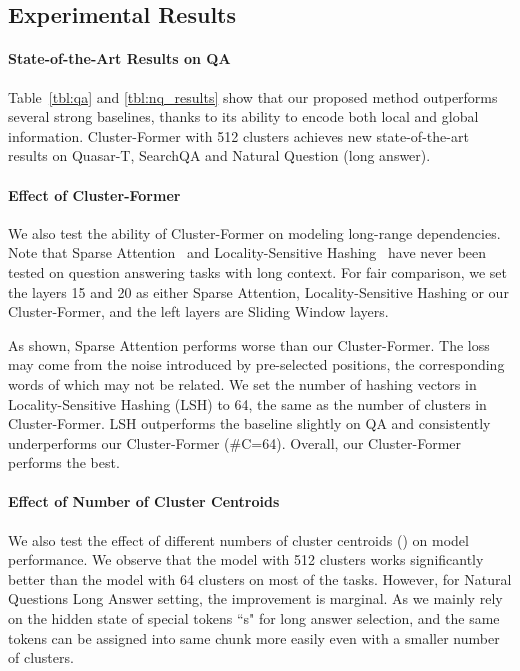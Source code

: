 \subsection{Experimental Results}

\paragraph{State-of-the-Art Results on QA} 
Table~\ref{tbl:qa} and \ref{tbl:nq_results} show that our proposed method outperforms several strong baselines, thanks to its ability to encode both local and global information.
Cluster-Former with 512 clusters achieves new state-of-the-art results on Quasar-T, SearchQA and Natural Question (long answer).

\paragraph{Effect of Cluster-Former}
We also test the ability of Cluster-Former on modeling long-range dependencies.
Note that Sparse Attention~\citep{sparsetransf} and Locality-Sensitive Hashing~\citep{reformer} have never been tested on question answering tasks with long context.
For fair comparison, we set the layers 15 and 20 as either Sparse Attention, Locality-Sensitive Hashing or our Cluster-Former, and the left layers are Sliding Window layers. 


As shown, Sparse Attention performs worse than our Cluster-Former.
The loss may come from the noise introduced by pre-selected positions, the corresponding words of which may not be related.
We set the number of hashing vectors in Locality-Sensitive Hashing (LSH) to 64, the same as the number of clusters in Cluster-Former.
LSH outperforms the baseline slightly on QA and consistently underperforms our Cluster-Former (\#C=64).
Overall, our Cluster-Former performs the best.

\paragraph{Effect of Number of Cluster Centroids} 
We also test the effect of different numbers of cluster centroids () on model performance. 
We observe that the model with 512 clusters works significantly better than the model with 64 clusters on most of the tasks.
However, for Natural Questions Long Answer setting, the improvement is marginal. As we mainly rely on the hidden state of special tokens ``s" for long answer selection, and the same tokens can be assigned into same chunk more easily even with a smaller number of clusters.


